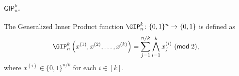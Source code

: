 	\paragraph{$\mathsf{GIP}^k_n$.}
	
	The Generalized Inner Product function $\GIP^k_{n}\colon \{0,1\}^{n} \to \{0,1\}$ is defined as
	\[
	    \GIP_{n}^{k}\left(x^{(1)},x^{(2)},\dots,x^{(k)}\right) = \sum_{j=1}^{n/k} \bigwedge_{i=1}^{k} x_{j}^{(i)}~(\mathsf{mod}\;2),
	\]
	where $x^{(i)}\in \{0,1\}^{n/k}$ for each $i\in [k]$.
